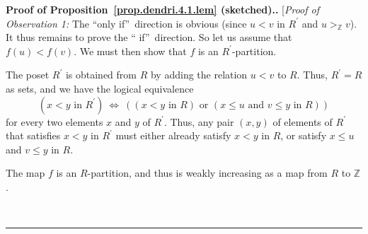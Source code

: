 \documentclass[numbers=enddot,12pt,final,onecolumn,notitlepage]{scrartcl}%
\theoremstyle{definition}
\newenvironment{proof}[1][Proof]{\noindent\textbf{#1.} }{\ \rule{0.5em}{0.5em}}
\newenvironment{verlong}{}{}
\begin{document}
\begin{verlong}
\begin{proof}[Proof of Proposition~\ref{prop.dendri.4.1.lem} (sketched).]
[\textit{Proof of Observation 1:} The \textquotedblleft only
if\textquotedblright\ direction is obvious (since $u<v$ in $R^{\prime}$ and
$u>_{\mathbb{Z}}v$). It thus remains to prove the \textquotedblleft
if\textquotedblright\ direction. So let us assume that $f\left(  u\right)
<f\left(  v\right)  $. We must then show that $f$ is an $R^{\prime}$-partition.

The poset $R^{\prime}$ is obtained from $R$ by adding the relation $u<v$ to
$R$. Thus, $R^{\prime}=R$ as sets, and we have the logical equivalence%
\[
\left(  x<y\text{ in }R^{\prime}\right)  \ \Longleftrightarrow\ \left(
\left(  x<y\text{ in }R\right)  \text{ or }\left(  x\leq u\text{ and }v\leq
y\text{ in }R\right)  \right)
\]
for every two elements $x$ and $y$ of $R^{\prime}$. Thus, any pair $\left(
x,y\right)  $ of elements of $R^{\prime}$ that satisfies $x<y$ in $R^{\prime}$
must either already satisfy $x<y$ in $R$, or satisfy $x\leq u$ and $v\leq y$
in $R$.

The map $f$ is an $R$-partition, and thus is weakly increasing as a map from
$R$ to $\mathbb{Z}$.


\end{proof}
\end{verlong}
\end{document}
